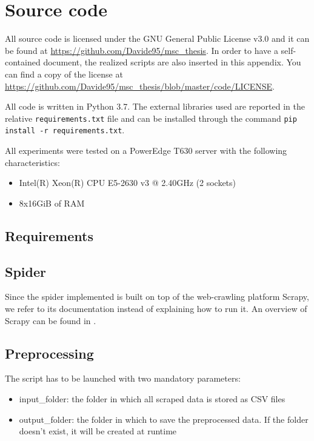\chapter{Source code}
All source code is licensed under the GNU General Public License v3.0 and it can be found at \url{https://github.com/Davide95/msc_thesis}.
In order to have a self-contained document, the realized scripts are also inserted in this appendix.
You can find a copy of the license at \url{https://github.com/Davide95/msc_thesis/blob/master/code/LICENSE}.

All code is written in Python 3.7. The external libraries used are reported in the relative \texttt{requirements.txt} file and can be installed through the command \texttt{pip install -r requirements.txt}.

All experiments were tested on a PowerEdge T630 server with the following characteristics:
\begin{itemize}
    \item Intel(R) Xeon(R) CPU E5-2630 v3 @ 2.40GHz (2 sockets)
    \item 8x16GiB of RAM
\end{itemize}

\section{Requirements}
\begin{minipage}{\linewidth}
    
\end{minipage}

\section{Spider} \label{spider}

Since the spider implemented is built on top of the web-crawling platform Scrapy, we refer to its documentation instead of explaining how to run it.
An overview of Scrapy can be found in \cite{kouzis2016learning}.



\section{Preprocessing} \label{preprocessing}
The script has to be launched with two mandatory parameters:
\begin{itemize}
    \item input\_folder: the folder in which all scraped data is stored as CSV files
    \item output\_folder: the folder in which to save the preprocessed data. If the folder doesn't exist, it will be created at runtime
\end{itemize}

